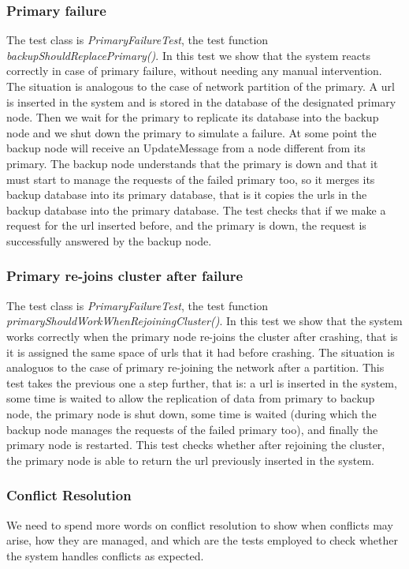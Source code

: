 \documentclass{article}
\begin{document}
\subsubsection{Primary failure} 
The test class is \textit{PrimaryFailureTest}, the test function \textit{backupShouldReplacePrimary()}. In this test we show that the system reacts correctly in case of primary failure, without needing any manual intervention. The situation is analogous to the case of network partition of the primary. 
A url is inserted in the system and is stored in the database of the designated primary node. Then we wait for the primary to replicate its database into the backup node and we shut down the primary to simulate a failure. At some point the backup node will receive an UpdateMessage from a node different from its primary. The backup node understands that the primary is down and that it must start to manage the requests of the failed primary too, so it merges its backup database into its primary database, that is it copies the urls in the backup database into the primary database. The test checks that if we make a request for the url inserted before, and the primary is down, the request is successfully answered by the backup node.




\subsubsection{Primary re-joins cluster after failure} 
The test class is \textit{PrimaryFailureTest}, the test function \textit{primaryShouldWorkWhenRejoiningCluster()}. In this test we show that the system works correctly when the primary node re-joins the cluster after crashing, that is it is assigned the same space of urls that it had before crashing. The situation is analoguos to the case of primary re-joining the network after a partition.
This test takes the previous one a step further, that is: a url is inserted in the system, some time is waited to allow the replication of data from primary to backup node, the primary node is shut down, some time is waited (during which the backup node manages the requests of the failed primary too), and finally the primary node is restarted. This test checks whether after rejoining the cluster, the primary node is able to return the url previously inserted in the system.

\subsubsection{Conflict Resolution} We need to spend more words on conflict resolution to show when conflicts may arise, how they are managed, and which are the tests employed to check whether the system handles conflicts as expected.
\end{document}
